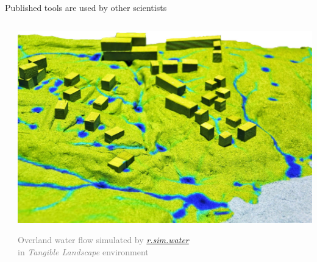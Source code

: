 \documentclass[xcolor={dvipsnames,usenames},beamer,aspectratio=169]{beamer}
\newcommand{\gmodule}[1]{\href{http://grass.osgeo.org/grass74/manuals/#1.html}{\emph{#1}}}
\begin{document}
\begin{frame}{Published tools are used by other scientists}
\begin{columns}
\begin{column}{0.5\textwidth}
\end{column}
\begin{column}{0.5\textwidth}
\centering
\includegraphics[width=\textwidth]{rsimwater_architects}

\textcolor{gray}{
\footnotesize
Overland water flow simulated by \gmodule{r.sim.water}
\\
in \emph{Tangible Landscape} environment
}

\end{column}
\end{columns}

\end{frame}
\end{document}
